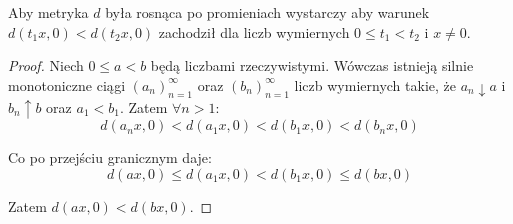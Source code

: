 \begin{lem}
  Aby metryka $d$ była rosnąca po promieniach wystarczy aby warunek $d(t_1 x, 0) < d(t_2 x, 0)$ zachodził dla liczb wymiernych $0 \leq t_1 < t_2$ i $x \neq 0$.
  
  \begin{proof}
    Niech $0 \leq a < b$ będą liczbami rzeczywistymi.
    Wówczas istnieją silnie monotoniczne ciągi $(a_n)_{n=1}^\infty$ oraz $(b_n)_{n=1}^\infty$ liczb wymiernych takie, że $a_n \downarrow a$ i $b_n \uparrow b$ oraz $a_1 < b_1$. Zatem $\forall n > 1$:
    \[d(a_n x, 0) < d(a_1 x, 0) < d(b_1 x, 0) < d(b_n x, 0)\]
    
    Co po przejściu granicznym daje:
    \[d(a x, 0) \leq d(a_1 x, 0) < d(b_1 x, 0) \leq d(b x, 0)\]
    
    Zatem $d(ax, 0) < d(bx, 0)$. 
  \end{proof}
\end{lem}


